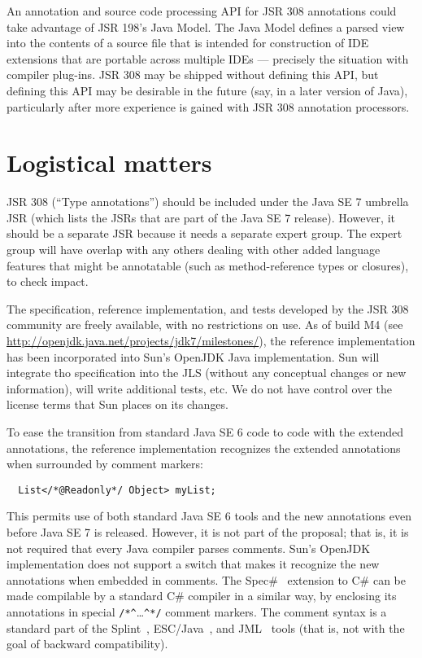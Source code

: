 \documentclass[10pt]{article}
\begin{document}
An annotation and source code processing API for JSR 308 annotations could
take advantage of JSR 198's Java Model.  The Java Model defines a parsed
view into the contents of a source file that is intended for construction
of IDE extensions that are portable across multiple IDEs --- precisely the
situation with compiler plug-ins.  JSR 308 may be shipped without defining
this API, but defining this API may be desirable in the future (say, in a
later version of Java), particularly after more experience is gained with
JSR 308 annotation processors.


\section{Logistical matters\label{logistics}}

JSR 308 (``Type annotations'') should be included under the Java SE 7
umbrella JSR (which lists the JSRs that are part of the Java SE 7 release).
However, it should be a separate JSR because it needs a separate expert group.
The expert group will have overlap with any others dealing with other
added language features that might be annotatable (such as method-reference
types or closures), to check impact.

The specification, reference implementation, and tests developed by the
JSR 308 community are freely available, with no restrictions on use.  As of
build M4 (see \url{http://openjdk.java.net/projects/jdk7/milestones/}), the
reference implementation has been incorporated into Sun's OpenJDK Java
implementation.  Sun will integrate tho specification into the JLS (without
any conceptual changes or new information), will write additional tests,
etc.  We do not have control over the license terms that Sun places on its
changes.

To ease the transition from standard Java SE 6 code to code with the extended
annotations, the reference implementation recognizes the extended
annotations when surrounded by comment markers:
\begin{Verbatim}
  List</*@Readonly*/ Object> myList;
\end{Verbatim}
This permits use of both standard Java SE 6 tools and the new annotations even
before Java SE 7 is released.  However, it is not part of the proposal;
that is, it is not required that every Java compiler parses comments.
Sun's OpenJDK implementation does not support a switch that
makes it recognize the new annotations when embedded in comments.
The Spec\#~\cite{BarnettLS2004} extension to C\# can be made compilable by
a standard C\# compiler in a similar way, by enclosing its annotations in
special \verb|/*^|\ldots\verb|^*/| comment markers.
The  comment syntax is a standard part of the
Splint~\cite{Evans96}, ESC/Java~\cite{FlanaganLLNSS02}, and
JML~\cite{LeavensBR2006:JML} tools (that is, not
with the goal of backward compatibility).
\end{document}
